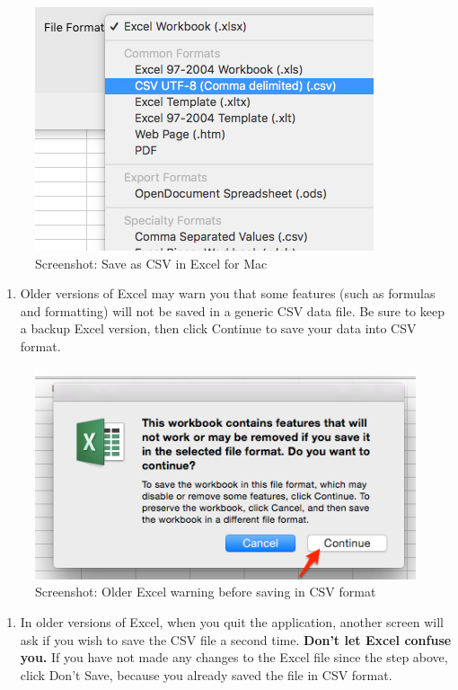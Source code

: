 \documentclass[
  english,
]{book}
\providecommand{\tightlist}{%
  \setlength{\itemsep}{0pt}\setlength{\parskip}{0pt}}
\begin{document}
\begin{figure}
\centering
\includegraphics{images/02-spreadsheet/excel-save-as-csv.png}
\caption{Screenshot: Save as CSV in Excel for Mac}
\end{figure}

\begin{enumerate}
\def\labelenumi{\arabic{enumi})}
\setcounter{enumi}{2}
\tightlist
\item
  Older versions of Excel may warn you that some features (such as formulas and formatting) will not be saved in a generic CSV data file. Be sure to keep a backup Excel version, then click Continue to save your data into CSV format.
\end{enumerate}

\begin{figure}
\centering
\includegraphics{images/02-spreadsheet/excel-save-as-csv-continue.png}
\caption{Screenshot: Older Excel warning before saving in CSV format}
\end{figure}

\begin{enumerate}
\def\labelenumi{\arabic{enumi})}
\setcounter{enumi}{3}
\tightlist
\item
  In older versions of Excel, when you quit the application, another screen will ask if you wish to save the CSV file a second time. \textbf{Don't let Excel confuse you.} If you have not made any changes to the Excel file since the step above, click Don't Save, because you already saved the file in CSV format.
\end{enumerate}
\end{document}
